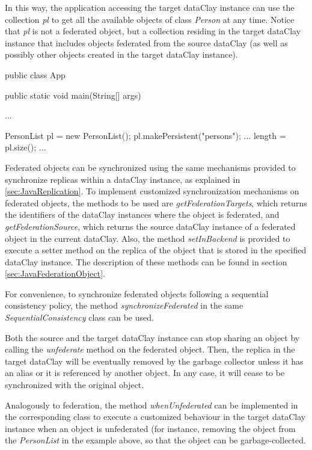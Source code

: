 In this way, the application accessing the target dataClay instance can use the collection \textit{pl} to get all the available objects of class \textit{Person} at any time. Notice that \textit{pl} is not a federated object, but a collection residing in the target dataClay instance that includes objects federated from the source dataClay (as well as possibly other objects created in the target dataClay instance).

\begin{tBox}
\begin{java}
public class App {
  public static void main(String[] args) {
    ...
    
    PersonList pl = new PersonList();
    pl.makePersistent("persons");
    ...
    length = pl.size();
    ...
  }
}
\end{java}
\end{tBox}
 
Federated objects can be synchronized using the same mechanisms provided to synchronize replicas within a dataClay instance, as explained in \ref{sec:JavaReplication}. To implement customized synchronization mechanisms on federated objects, the methods to be used are \textit{getFederationTargets}, which returns the identifiers of the dataClay instances where the object is federated, and \textit{getFederationSource}, which returns the source dataClay instance of a federated object in the current dataClay. Also, the method \textit{setInBackend} is provided to execute a setter method on the replica of the object that is stored in the specified dataClay instance. The description of these methods can be found in section \ref{sec:JavaFederationObject}.

For convenience, to synchronize federated objects following a sequential consistency policy, the method \textit{synchronizeFederated} in the same \textit{SequentialConsistency} class can be used.

Both the source and the target dataClay instance can stop sharing an object by calling the \textit{unfederate} method on the federated object. Then, the replica in the target dataClay will be eventually removed by the garbage collector unless it has an alias or it is referenced by another object. In any case, it will cease to be synchronized with the original object. 

Analogously to federation, the method \textit{whenUnfederated} can be implemented in the corresponding class to execute a customized behaviour in the target dataClay instance when an object is unfederated (for instance, removing the object from the \textit{PersonList} in the example above, so that the object can be garbage-collected.

\FEDERATION{

}
